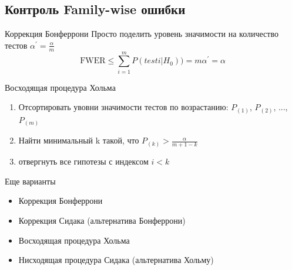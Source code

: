 \subsection{Контроль Family-wise ошибки}







\begin{frame}{Коррекция Бонферрони}
    Просто поделить уровень значимости на количество тестов
    $\alpha^\prime = \frac{\alpha}{m}$
    $$\text{FWER} \leq \sum_{i=1}^{m}P(testi|H_0))= m\alpha^\prime = \alpha$$ 
\end{frame}

\begin{frame}{Восходящая процедура Хольма}
    \begin{enumerate}
        \item Отсортировать увовни значимости тестов по возрастанию: $P_{(1)}$, $P_{(2)}$, ..., $P_{(m)}$
        \item Найти минимальный k такой, что $P_{(k)} > \frac{\alpha}{m+1-k}$
        \item отвергнуть все гипотезы с индексом $i < k$
    \end{enumerate}
\end{frame}


\begin{frame}{Еще варианты}
    \begin{itemize}
        \item Коррекция Бонферрони
        \item Коррекция Сидака (альтернатива Бонферрони)
        \item Восходящая процедура Хольма
        \item Нисходящая процедура Сидака (альтернатива Хольму)
    \end{itemize}
\end{frame}



